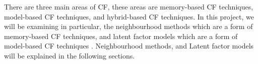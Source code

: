 




There are three main areas of CF, these areas are memory-based CF techniques, model-based CF techniques, and hybrid-based CF techniques. In this project, we will be examining in particular, the neighbourhood methods which are a form of memory-based CF techniques, and latent factor models which are a form of model-based CF techniques \cite{survey, koren2009matrix}. Neighbourhood methods, and Latent factor models will be explained in the following sections. 

